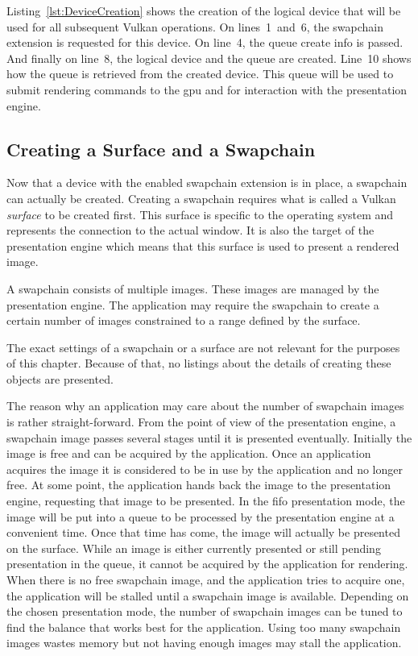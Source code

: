       Listing~\ref{lst:DeviceCreation} shows the creation of the logical device that will be used for all subsequent Vulkan operations.
      On lines~1~and~6, the swapchain extension is requested for this device.
      On line~4, the queue create info is passed.
      And finally on line~8, the logical device and the queue are created.
      Line~10 shows how the queue is retrieved from the created device.
      This queue will be used to submit rendering commands to the \gls{gpu} and for interaction with the presentation engine.

    \subsection{Creating a Surface and a Swapchain}
      Now that a device with the enabled swapchain extension is in place, a swapchain can actually be created.
      Creating a swapchain requires what is called a Vulkan \textit{surface} to be created first.
      This surface is specific to the operating system and represents the connection to the actual window.
      It is also the target of the presentation engine which means that this surface is used to present a rendered image.

      A swapchain consists of multiple images.
      These images are managed by the presentation engine.
      The application may require the swapchain to create a certain number of images constrained to a range defined by the surface.

      The exact settings of a swapchain or a surface are not relevant for the purposes of this chapter.
      Because of that, no listings about the details of creating these objects are presented.

      The reason why an application may care about the number of swapchain images is rather straight-forward.
      From the point of view of the presentation engine, a swapchain image passes several stages until it is presented eventually.
      Initially the image is free and can be acquired by the application.
      Once an application acquires the image it is considered to be in use by the application and no longer free.
      At some point, the application hands back the image to the presentation engine, requesting that image to be presented.
      In the \gls{fifo} presentation mode, the image will be put into a queue to be processed by the presentation engine at a convenient time.
      Once that time has come, the image will actually be presented on the surface.
      While an image is either currently presented or still pending presentation in the queue, it cannot be acquired by the application for rendering.
      When there is no free swapchain image, and the application tries to acquire one, the application will be stalled until a swapchain image is available.
      Depending on the chosen presentation mode, the number of swapchain images can be tuned to find the balance that works best for the application.
      Using too many swapchain images wastes memory but not having enough images may stall the application.

